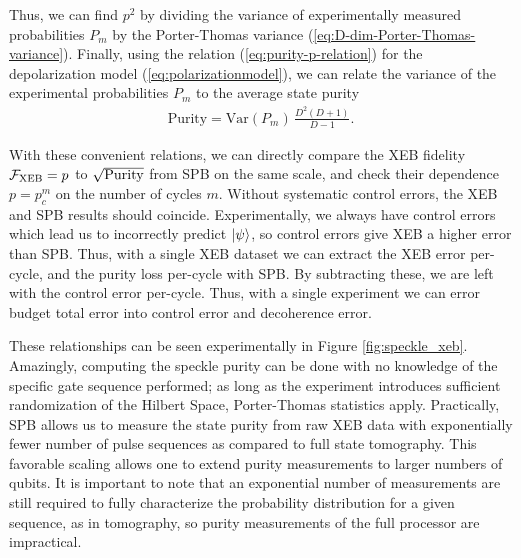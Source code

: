 Thus, we can find $p^2$ by dividing the variance of experimentally measured probabilities $P_m$ by the Porter-Thomas variance (\ref{eq:D-dim-Porter-Thomas-variance}). Finally, using the relation (\ref{eq:purity-p-relation}) for the depolarization model (\ref{eq:polarizationmodel}), we can relate the variance of the experimental probabilities $P_m$ to the average state purity
\begin{align}
  \label{eq:specklypuritydefinition}
  \textrm{Purity} = \textrm{Var}(P_m) \, \frac{D^2 (D+1)}{D-1}.
\end{align}

With these convenient relations, we can directly compare the XEB fidelity $\mathcal{F}_{\text{XEB}}=p$ to $\sqrt{\rm Purity}$ from SPB on the same scale, and check their dependence $p=p_c^m$ on the number of cycles $m$. Without systematic control errors, the XEB and SPB results should coincide. Experimentally, we always have control errors which lead us to incorrectly predict $\mathinner{|{\psi}\rangle}$, so control errors give XEB a higher error than SPB. Thus, with a single XEB dataset we can extract the XEB error per-cycle, and the purity loss per-cycle with SPB. By subtracting these, we are left with the control error per-cycle. Thus, with a single experiment we can error budget total error into control error and decoherence error. 

These relationships can be seen experimentally in Figure \ref{fig:speckle_xeb}. Amazingly, computing the speckle purity can be done with no knowledge of the specific gate sequence performed; as long as the experiment introduces sufficient randomization of the Hilbert Space, Porter-Thomas statistics apply. Practically, SPB allows us to measure the state purity from raw XEB data with exponentially fewer number of pulse sequences as compared to full state tomography. This favorable scaling allows one to extend purity measurements to larger numbers of qubits. It is important to note that an exponential number of measurements are still required to fully characterize the probability distribution for a given sequence, as in tomography, so purity measurements of the full processor are impractical. 

